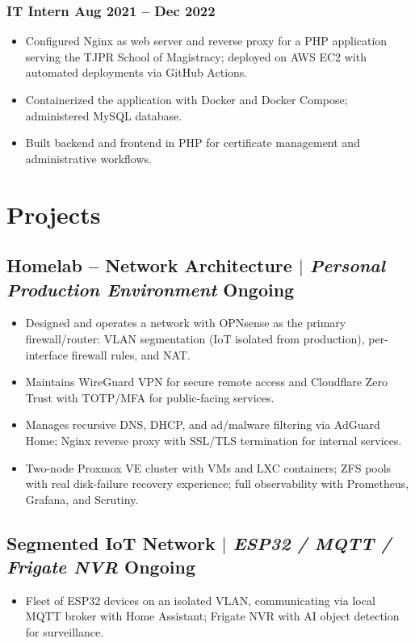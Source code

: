\documentclass[10.5pt]{article}
\begin{document}
\subsubsection{IT Intern \hfill Aug 2021 -- Dec 2022}
\begin{itemize}
    \item Configured Nginx as web server and reverse proxy for a PHP application serving the TJPR
          School of Magistracy; deployed on AWS EC2 with automated deployments via GitHub Actions.
    \item Containerized the application with Docker and Docker Compose; administered MySQL database.
    \item Built backend and frontend in PHP for certificate management and administrative workflows.
\end{itemize}

\section{Projects}
\subsection{Homelab -- Network Architecture $|$ \normalfont\textit{Personal Production Environment} \hfill Ongoing}
\begin{itemize}
    \item Designed and operates a network with OPNsense as the primary firewall/router: VLAN segmentation
          (IoT isolated from production), per-interface firewall rules, and NAT.
    \item Maintains WireGuard VPN for secure remote access and Cloudflare Zero Trust with TOTP/MFA
          for public-facing services.
    \item Manages recursive DNS, DHCP, and ad/malware filtering via AdGuard Home; Nginx reverse proxy
          with SSL/TLS termination for internal services.
    \item Two-node Proxmox VE cluster with VMs and LXC containers; ZFS pools with real disk-failure
          recovery experience; full observability with Prometheus, Grafana, and Scrutiny.
\end{itemize}
\subsection{Segmented IoT Network $|$ \normalfont\textit{ESP32 / MQTT / Frigate NVR} \hfill Ongoing}
\begin{itemize}
    \item Fleet of ESP32 devices on an isolated VLAN, communicating via local MQTT broker with Home
          Assistant; Frigate NVR with AI object detection for surveillance.
\end{itemize}
\end{document}
